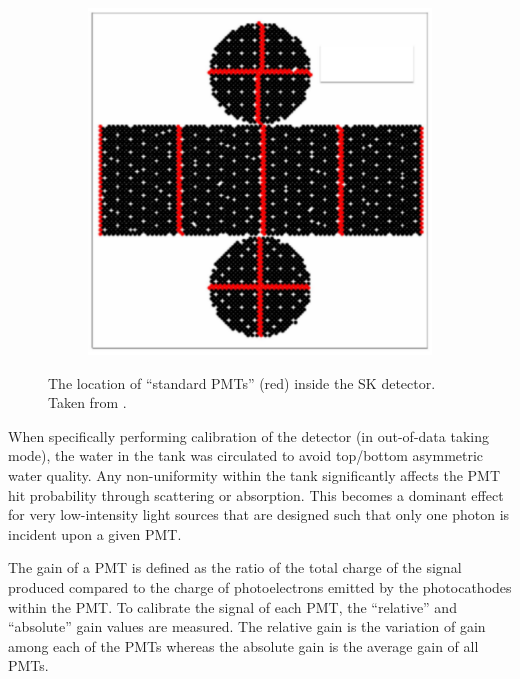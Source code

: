 \begin{figure}[h]
  \begin{subfigure}[t]{0.50\textwidth}
    \includegraphics[width=\textwidth, trim={0mm 0mm 0mm 0mm}, clip,page=1]{Figures/Detectors/StandardPMTs.pdf}
  \end{subfigure}
  \caption{The location of ``standard PMTs'' (red) inside the SK detector. Taken from \cite{Abe_2014_SKCalib}.}
  \label{fig:T2KSKExp_SK_StandardPMTs}
\end{figure}

When specifically performing calibration of the detector (in out-of-data taking mode), the water in the tank was circulated to avoid top/bottom asymmetric water quality. Any non-uniformity within the tank significantly affects the PMT hit probability through scattering or absorption. This becomes a dominant effect for very low-intensity light sources that are designed such that only one photon is incident upon a given PMT.

The gain of a PMT is defined as the ratio of the total charge of the signal produced compared to the charge of photoelectrons emitted by the photocathodes within the PMT. To calibrate the signal of each PMT, the ``relative'' and ``absolute'' gain values are measured. The relative gain is the variation of gain among each of the PMTs whereas the absolute gain is the average gain of all PMTs. 


